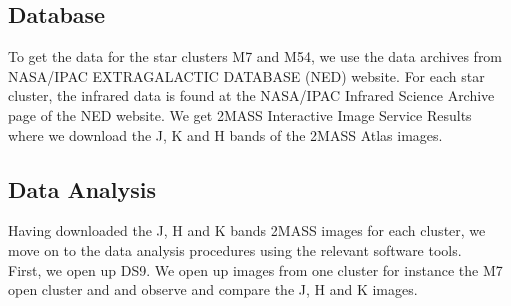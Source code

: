 \documentclass[12pt]{article}
\begin{document}
		\subsection{Database}
		To get the data for the star clusters M7 and M54, we use the data archives from NASA/IPAC EXTRAGALACTIC DATABASE (NED) website. For each star cluster, the infrared data is found at the NASA/IPAC Infrared Science Archive page of the NED website. We get 2MASS Interactive Image Service Results where we download the J, K and H bands of the 2MASS Atlas images.
		\subsection{Data Analysis}
		Having downloaded the J, H and K bands 2MASS images for each cluster, we move on to the data analysis procedures using the relevant software tools.\\
		First, we open up DS9. We open up images from one cluster for instance the M7 open cluster and and observe and compare the J, H and K images.
\end{document}
